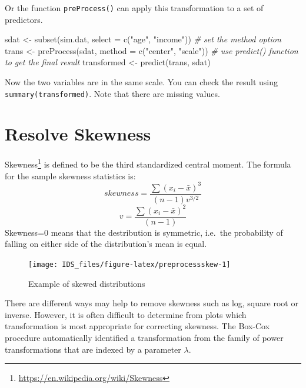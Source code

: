 \documentclass[
  12pt,
]{krantz}
\makeatletter
\newenvironment{Shaded}{\begin{snugshade}}{\end{snugshade}}
\newcommand{\AttributeTok}[1]{\textcolor[rgb]{0.61,0.61,0.61}{#1}}
\newcommand{\CommentTok}[1]{\textcolor[rgb]{0.37,0.37,0.37}{\textit{#1}}}
\newcommand{\FunctionTok}[1]{\textcolor[rgb]{0,0,0}{#1}}
\newcommand{\NormalTok}[1]{#1}
\newcommand{\OtherTok}[1]{\textcolor[rgb]{0.37,0.37,0.37}{#1}}
\newcommand{\StringTok}[1]{\textcolor[rgb]{0.5,0.5,0.5}{#1}}
\renewcommand{\href}[2]{#2\footnote{\url{#1}}}
\newenvironment{kframe}{%
\medskip{}
\setlength{\fboxsep}{.8em}
 \def\at@end@of@kframe{}%
 \ifinner\ifhmode%
  \def\at@end@of@kframe{\end{minipage}}%
  \begin{minipage}{\columnwidth}%
 \fi\fi%
 \def\FrameCommand##1{\hskip\@totalleftmargin \hskip-\fboxsep
 \colorbox{shadecolor}{##1}\hskip-\fboxsep
     \hskip-\linewidth \hskip-\@totalleftmargin \hskip\columnwidth}%
 \MakeFramed {\advance\hsize-\width
   \@totalleftmargin\z@ \linewidth\hsize
   \@setminipage}}%
 {\par\unskip\endMakeFramed%
 \at@end@of@kframe}
\renewenvironment{Shaded}{\begin{kframe}}{\end{kframe}}
\makeatother
\begin{document}
Or the function \texttt{preProcess()} can apply this transformation to a set of predictors.

\begin{Shaded}
\begin{Highlighting}[]
\NormalTok{sdat }\OtherTok{\textless{}{-}} \FunctionTok{subset}\NormalTok{(sim.dat, }\AttributeTok{select =} \FunctionTok{c}\NormalTok{(}\StringTok{"age"}\NormalTok{, }\StringTok{"income"}\NormalTok{))}
\CommentTok{\# set the \textquotesingle{}method\textquotesingle{} option}
\NormalTok{trans }\OtherTok{\textless{}{-}} \FunctionTok{preProcess}\NormalTok{(sdat, }\AttributeTok{method =} \FunctionTok{c}\NormalTok{(}\StringTok{"center"}\NormalTok{, }\StringTok{"scale"}\NormalTok{))}
\CommentTok{\# use predict() function to get the final result}
\NormalTok{transformed }\OtherTok{\textless{}{-}} \FunctionTok{predict}\NormalTok{(trans, sdat)}
\end{Highlighting}
\end{Shaded}

Now the two variables are in the same scale. You can check the result using \texttt{summary(transformed)}. Note that there are missing values.

\hypertarget{resolve-skewness}{%
\section{Resolve Skewness}\label{resolve-skewness}}

\href{https://en.wikipedia.org/wiki/Skewness}{Skewness} is defined to be the third standardized central moment. The formula for the sample skewness statistics is:
\[ skewness=\frac{\sum(x_{i}-\bar{x})^{3}}{(n-1)v^{3/2}}\]
\[v=\frac{\sum(x_{i}-\bar{x})^{2}}{(n-1)}\]
Skewness=0 means that the destribution is symmetric, i.e.~the probability of falling on either side of the distribution's mean is equal.

\begin{figure}

{\centering \texttt{[image: IDS\_files/figure-latex/preprocessskew-1]} 

}

\caption{Example of skewed distributions}\label{fig:preprocessskew}
\end{figure}

There are different ways may help to remove skewness such as log, square root or inverse. However, it is often difficult to determine from plots which transformation is most appropriate for correcting skewness. The Box-Cox procedure automatically identified a transformation from the family of power transformations that are indexed by a parameter \(\lambda\)\citep{BOXCOX1}.
\end{document}
